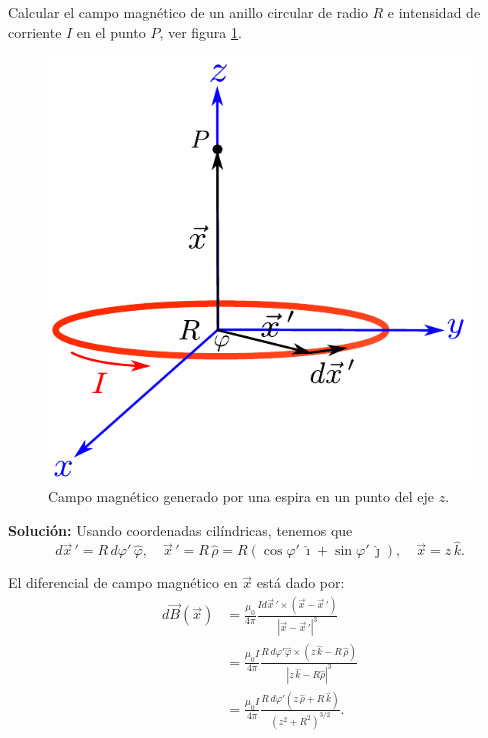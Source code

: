 \begin{ejemplo}
   Calcular el campo magnético de un anillo circular de radio $R$ e intensidad de corriente $I$ en el punto $P$, ver figura \ref{fig:Ej-2-Biot-Savart}.

\begin{figure}[H]
     \centering
     \includegraphics[scale = 0.7]{Figuras/Ej-2-Biot-Savart.pdf}
     \caption{Campo magnético generado por una espira en un punto del eje $z$.}
     \label{fig:Ej-2-Biot-Savart}
 \end{figure}

\textbf{Solución:} Usando coordenadas cilíndricas, tenemos que
$$d\vec{x}\,' = R \,d \varphi' \,\hat{\varphi}, \quad \vec{x}\,' = R \,\hat{\rho} = R (\cos \varphi' \,\hat{\imath} + \sin \varphi' \,\hat{\jmath}), \quad  \vec{x} = z\,\hat{k}.$$

El diferencial de campo magnético en $\Vec{x}$ está dado por:
\begin{align*}
 d\vec{B}(\vec{x}) &= \frac{\mu_0}{4\pi}  \frac{I d\vec{x}\,' \times (\vec{x} - \vec{x}\,')}{|\vec{x} - \vec{x}\,'|^3} \\
&=  \frac{\mu_0 I}{4\pi} \frac{R \,d\varphi' \hat{\varphi} \times (z \,\hat{k} - R \,\hat{\rho})}{|z \,\hat{k} - R \hat{\rho}|^3} \\
&= \frac{\mu_0 I}{4\pi} \frac{R\,d\varphi' (z \,\hat{\rho} + R \,\hat{k})}{(z^2 + R^2)^{3/2}}. 
\end{align*}


\end{ejemplo}
